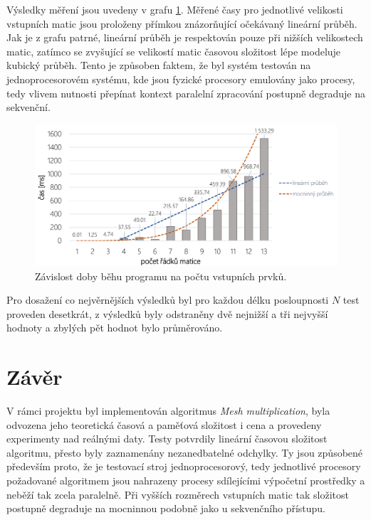 \documentclass[12pt,a4paper,titlepage,final]{article}
\begin{document}
Výsledky měření jsou uvedeny v grafu \ref{fig:CasVSPocetPrvku}. Měřené časy pro jednotlivé velikosti vstupních matic jsou proloženy přímkou znázorňující očekávaný lineární průběh. Jak je z grafu patrné, lineární průběh je respektován pouze při nižších velikostech matic, zatímco se zvyšující se velikostí matic časovou složitost lépe modeluje kubický průběh. Tento je způsoben faktem, že byl systém testován na jednoprocesorovém systému, kde jsou fyzické procesory emulovány jako procesy, tedy vlivem nutnosti přepínat kontext paralelní zpracování postupně degraduje na sekvenční.

\begin{figure}[!hbt]
	\centering
	\includegraphics[width=1.0\linewidth]{img/graf.pdf}
	\caption{Závislost doby běhu programu na počtu vstupních prvků.}
	\label{fig:CasVSPocetPrvku}
\end{figure}

Pro dosažení co nejvěrnějších výsledků byl pro každou délku posloupnosti $N$ test proveden desetkrát, z výsledků byly odstraněny dvě nejnižší a tři nejvyšší hodnoty a zbylých pět hodnot bylo průměrováno.

\section{Závěr}
V rámci projektu byl implementován algoritmus \textit{Mesh multiplication}, byla odvozena jeho teoretická časová a paměťová složitost i cena a provedeny experimenty nad reálnými daty. Testy potvrdily lineární časovou složitost algoritmu, přesto byly zaznamenány nezanedbatelné odchylky. Ty jsou způsobené především proto, že je testovací stroj jednoprocesorový, tedy jednotlivé procesory požadované algoritmem jsou nahrazeny procesy sdílejícími výpočetní prostředky a neběží tak zcela paralelně. Při vyšších rozměrech vstupních matic tak složitost postupně degraduje na mocninnou podobně jako u sekvenčního přístupu.

\end{document}
